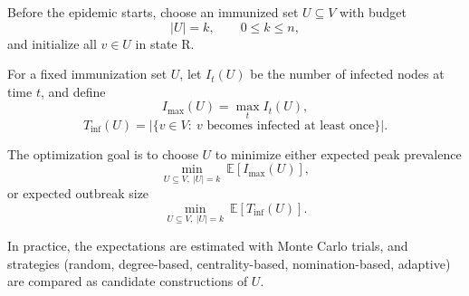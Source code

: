\documentclass[9pt,twocolumn,twoside]{pnas-new}
\begin{document}
Before the epidemic starts, choose an immunized set $U\subseteq V$ with budget
\begin{equation}
|U|=k, \qquad 0\le k\le n,
\end{equation}
and initialize all $v\in U$ in state $\mathrm{R}$.

For a fixed immunization set $U$, let $I_t(U)$ be the number of infected nodes at time $t$, and define
\begin{equation}
I_{\max}(U)=\max_t I_t(U),
\end{equation}
\begin{equation*}
T_{\mathrm{inf}}(U)=\left|\{v\in V:\ v\text{ becomes infected at least once}\}\right|.
\end{equation*}

The optimization goal is to choose $U$ to minimize either expected peak prevalence
\begin{equation}
\min_{U\subseteq V,\ |U|=k} \ \mathbb{E}[I_{\max}(U)],
\end{equation}
or expected outbreak size
\begin{equation}
\min_{U\subseteq V,\ |U|=k} \ \mathbb{E}[T_{\mathrm{inf}}(U)].
\end{equation}

In practice, the expectations are estimated with Monte Carlo trials, and strategies (random, degree-based, centrality-based, nomination-based, adaptive) are compared as candidate constructions of $U$.
\end{document}
